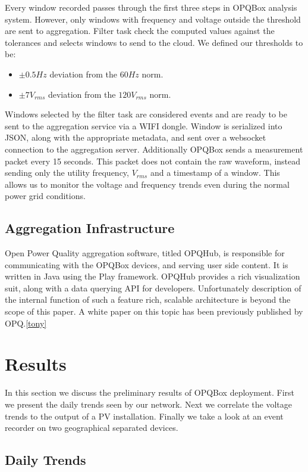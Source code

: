 Every window recorded passes through the first three steps in OPQBox analysis system. However, only windows with frequency and voltage outside the threshold are sent to aggregation.  Filter task check the computed values against the tolerances and selects windows to send to the cloud. We defined our thresholds to be:

\begin{itemize}
\item $\pm 0.5Hz$ deviation from the $60Hz$ norm.
\item $\pm 7V_{rms}$ deviation from the $120V_{rms}$ norm.
\end{itemize}

Windows selected by the filter task are considered events and are ready to be sent to the aggregation service via a WIFI dongle. Window is serialized into JSON, along with the appropriate metadata, and sent over a websocket connection to the aggregation server. Additionally OPQBox sends a measurement packet every 15 seconds. This packet does not contain the raw waveform, instead sending only the utility frequency, $V_{rms}$ and a timestamp of a window. This allows us to monitor the voltage and frequency trends even during the normal power grid conditions. 

\subsection{Aggregation Infrastructure}
Open Power Quality aggregation software, titled OPQHub, is responsible for communicating with the OPQBox devices, and serving user side content. It is written in Java using the Play framework. OPQHub provides a rich visualization suit, along with a data querying API for developers. Unfortunately description of the internal function of such a feature rich, scalable architecture is beyond the scope of this paper. A white paper on this topic has been previously published by OPQ.\ref{tony}

\section{Results}

In this section we discuss the preliminary results of  OPQBox deployment. First we present the daily trends seen by our network. Next we correlate the voltage trends to the output
of a PV installation. Finally we take a look at an event recorder on two geographical separated devices.

\subsection{Daily Trends}

